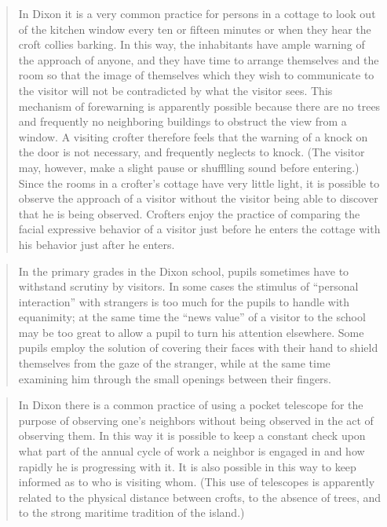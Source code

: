 \documentclass[twoside,symmetric,nobib,justified]{tufte-book}
\begin{document}
\begin{quote}
In Dixon it is a very common practice for persons in a cottage to look
out of the kitchen window every ten or fifteen minutes or when they hear
the croft collies barking. In this way, the inhabitants have ample
warning of the approach of anyone, and they have time to arrange
themselves and the room so that the image of themselves which they wish
to communicate to the visitor will not be contradicted by what the
visitor sees. This mechanism of forewarning is apparently possible
because there are no trees and frequently no neighboring buildings to
obstruct the view from a window. A visiting crofter therefore feels that
the warning of a knock on the door is not necessary, and frequently
neglects to knock. (The visitor may, however, make a slight pause or
shufflling sound before entering.) Since the rooms in a crofter's
cottage have very little light, it is possible to observe the approach
of a visitor without the visitor being able to discover that he is being
observed. Crofters enjoy the practice of comparing the facial expressive
behavior of a visitor just before he enters the cottage with his
behavior just after he enters.
\end{quote}

\begin{quote}
In the primary grades in the Dixon school, pupils some­times have to
withstand scrutiny by visitors. In some cases the stimulus of ``personal
interaction'' with strangers is too much for the pupils to handle with
equanimity; at the same time the ``news value'' of a visitor to the
school may be too great to allow a pupil to turn his attention
elsewhere. Some pupils em­ploy the solution of covering their faces with
their hand to shield themselves from the gaze of the stranger, while at
the same time examining him through the small openings between their
fingers.
\end{quote}

\begin{quote}
In Dixon there is a common practice of using a pocket telescope for the
purpose of observing one's neighbors without being observed in the act
of observing them. In this way it is possible to keep a constant check
upon what part of the annual cycle of work a neighbor is engaged in and
how rapidly he is progressing with it. It is also possible in this way
to keep informed as to who is visiting whom. (This use of telescopes is
apparently related to the physical distance between crofts, to the
absence of trees, and to the strong maritime tradition of the island.)
\end{quote}
\end{document}
